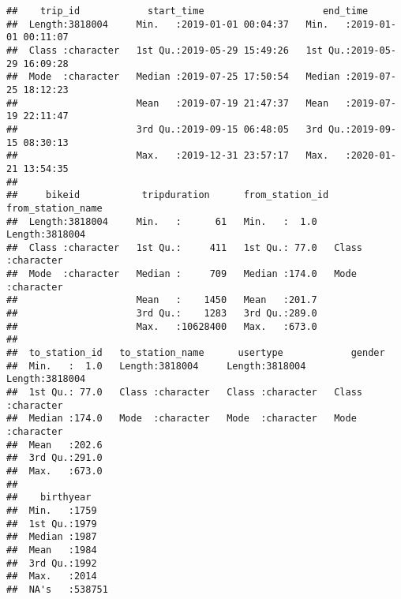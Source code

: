 \documentclass[
]{article}
\begin{document}
\begin{verbatim}
##    trip_id            start_time                     end_time                  
##  Length:3818004     Min.   :2019-01-01 00:04:37   Min.   :2019-01-01 00:11:07  
##  Class :character   1st Qu.:2019-05-29 15:49:26   1st Qu.:2019-05-29 16:09:28  
##  Mode  :character   Median :2019-07-25 17:50:54   Median :2019-07-25 18:12:23  
##                     Mean   :2019-07-19 21:47:37   Mean   :2019-07-19 22:11:47  
##                     3rd Qu.:2019-09-15 06:48:05   3rd Qu.:2019-09-15 08:30:13  
##                     Max.   :2019-12-31 23:57:17   Max.   :2020-01-21 13:54:35  
##                                                                                
##     bikeid           tripduration      from_station_id from_station_name 
##  Length:3818004     Min.   :      61   Min.   :  1.0   Length:3818004    
##  Class :character   1st Qu.:     411   1st Qu.: 77.0   Class :character  
##  Mode  :character   Median :     709   Median :174.0   Mode  :character  
##                     Mean   :    1450   Mean   :201.7                     
##                     3rd Qu.:    1283   3rd Qu.:289.0                     
##                     Max.   :10628400   Max.   :673.0                     
##                                                                          
##  to_station_id   to_station_name      usertype            gender         
##  Min.   :  1.0   Length:3818004     Length:3818004     Length:3818004    
##  1st Qu.: 77.0   Class :character   Class :character   Class :character  
##  Median :174.0   Mode  :character   Mode  :character   Mode  :character  
##  Mean   :202.6                                                           
##  3rd Qu.:291.0                                                           
##  Max.   :673.0                                                           
##                                                                          
##    birthyear     
##  Min.   :1759    
##  1st Qu.:1979    
##  Median :1987    
##  Mean   :1984    
##  3rd Qu.:1992    
##  Max.   :2014    
##  NA's   :538751
\end{verbatim}
\end{document}
